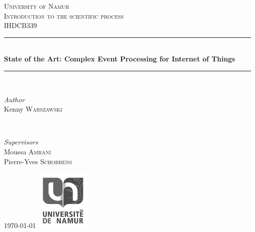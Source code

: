 \documentclass[11pt]{article}
\begin{document}
\begin{titlepage}
	\newcommand{\HRule}{\rule{\linewidth}{0.5mm}}
	\center
	\textsc{\LARGE University of Namur}\\[1.5cm]
	\textsc{\Large Introduction to the scientific process}\\[0.5cm]
	\textsc{\large IHDCB339}\\[0.5cm]
	\HRule\\[0.4cm]
	{\huge\bfseries State of the Art: Complex Event Processing for Internet of Things}\\[0.4cm]
	\HRule\\[1.5cm]	
	\begin{minipage}{0.4\textwidth}
		\begin{flushleft}
			\large
			\textit{Author}\\
			Kenny \textsc{Warszawski} 
		\end{flushleft}
	\end{minipage}
	~
	\begin{minipage}{0.4\textwidth}
		\begin{flushright}
			\large
			\textit{Supervisors}\\
			Moussa \textsc{Amrani}
			\\
			Pierre-Yves \textsc{Schobbens} 
		\end{flushright}
	\end{minipage}	
	\vfill\vfill\vfill
	{\large\today}
	\vfill\vfill
	\includegraphics[width=0.2\textwidth]{placeholder.png}\\[1cm]
	\vfill
\end{titlepage}
\end{document}
